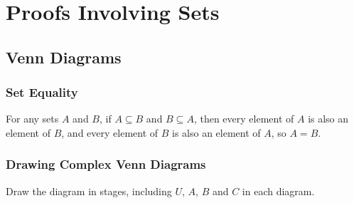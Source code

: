 \documentclass[../notes.tex]{subfiles}
\begin{document}
	\chapter{Proofs Involving Sets}
		\section{Venn Diagrams}
			\subsection{Set Equality}
				For any sets $A$ and $B$, if $A \subseteq B$ and $B \subseteq A$, then every element of $A$ is also an element of $B$, and every element of $B$ is also an element of $A$, so $A = B$.
			\subsection{Drawing Complex Venn Diagrams}
			Draw the diagram in stages, including $U$, $A$, $B$ and $C$ in each diagram.
\end{document}
